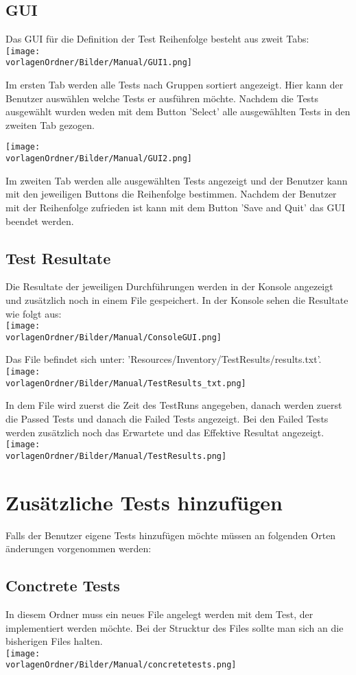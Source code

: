 \documentclass[
	ngerman,
	toc=listof, %
	toc=bibliography, %
	footnotes=multiple, %
	parskip=half, %
	numbers=noendperiod %
]{scrartcl}
\newcommand{\vorlagenOrdner}{../99_Vorlagen} %
\begin{document}
	\subsection{GUI}
		Das GUI für die Definition der Test Reihenfolge besteht aus zweit Tabs:\\
		\texttt{[image: \\vorlagenOrdner/Bilder/Manual/GUI1.png]}

		Im ersten Tab werden alle Tests nach Gruppen sortiert angezeigt. 
		Hier kann der Benutzer auswählen welche Tests er ausführen möchte.
		Nachdem die Tests ausgewählt wurden weden mit dem Button 'Select' alle ausgewählten Tests in den zweiten Tab gezogen.

		\texttt{[image: \\vorlagenOrdner/Bilder/Manual/GUI2.png]}

		Im zweiten Tab werden alle ausgewählten Tests angezeigt und der Benutzer kann mit den jeweiligen Buttons die Reihenfolge bestimmen.
		Nachdem der Benutzer mit der Reihenfolge zufrieden ist kann mit dem Button 'Save and Quit' das GUI beendet werden.

	\subsection{Test Resultate}
		Die Resultate der jeweiligen Durchführungen werden in der Konsole angezeigt und zusätzlich noch in einem File gespeichert.
		In der Konsole sehen die Resultate wie folgt aus: \\
		\texttt{[image: \\vorlagenOrdner/Bilder/Manual/ConsoleGUI.png]}

		Das File befindet sich unter: 'Resources/Inventory/TestResults/results.txt'.\\
		\texttt{[image: \\vorlagenOrdner/Bilder/Manual/TestResults\_txt.png]}

		In dem File wird zuerst die Zeit des TestRuns angegeben, danach werden zuerst die Passed Tests und danach die Failed Tests angezeigt.
		Bei den Failed Tests werden zusätzlich noch das Erwartete und das Effektive Resultat angezeigt.\\
		\texttt{[image: \\vorlagenOrdner/Bilder/Manual/TestResults.png]}

\section{Zusätzliche Tests hinzufügen}
	Falls der Benutzer eigene Tests hinzufügen möchte müssen an folgenden Orten änderungen vorgenommen werden:
	\subsection{Conctrete Tests}
		In diesem Ordner muss ein neues File angelegt werden mit dem Test, der implementiert werden möchte.
		Bei der Strucktur des Files sollte man sich an die bisherigen Files halten.\\
		\texttt{[image: \\vorlagenOrdner/Bilder/Manual/concretetests.png]}
\end{document}
